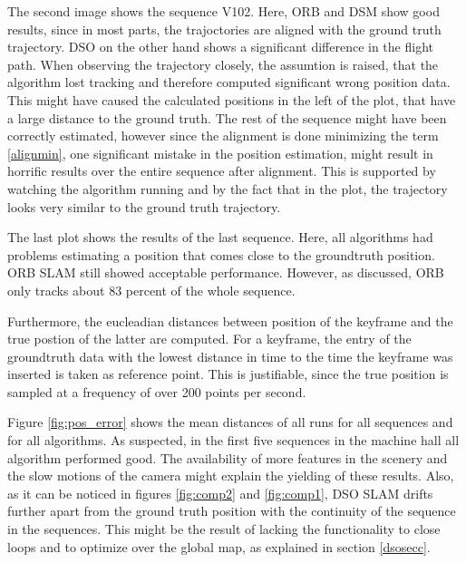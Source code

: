 	The second image shows the sequence V102. Here, ORB and DSM show good results, since in most parts, the trajoctories are aligned with the ground truth trajectory.
	DSO on the 
	other hand shows a significant difference in the flight path. When observing the trajectory closely, the assumtion is raised, that the algorithm lost tracking 
	and therefore computed significant wrong position data. This might have caused the calculated positions in the left of the plot, that have a large distance to 
	the ground truth. The rest of the sequence might have been correctly estimated, however since the alignment is done minimizing the term \ref{alignmin}, one significant 
	mistake in the position estimation, might result in horrific results over the entire sequence after alignment. This is supported by watching the algorithm running
	and by the fact that in the plot, the trajectory looks very similar to the ground truth trajectory.
	
	The last plot shows the results of the last sequence. Here, all algorithms had problems estimating a position that comes close to the groundtruth position. ORB
	SLAM still showed acceptable performance. However, as discussed, ORB only tracks about 83 percent of the whole sequence. 
	
	
	Furthermore, the eucleadian distances between position of the keyframe and the true postion of the latter are computed. For a keyframe, 
	the entry of the groundtruth data with the lowest distance in time to the time the keyframe was inserted is taken as reference point. 
	This is justifiable, since the true position is sampled at a frequency of over 200 points per second. 
	
	Figure \ref{fig:pos_error} shows the mean distances of all runs for all sequences and for all algorithms. As suspected, in the first five sequences in the machine 
	hall all algorithm performed good. The availability of more features in the scenery and the slow motions of the camera might explain the yielding of these results. 
	Also, as it can be noticed in figures \ref{fig:comp2} and \ref{fig:comp1}, DSO SLAM drifts further apart from the ground truth position with the continuity
	of the sequence in the sequences. 
	This might be the result of lacking the functionality to close loops and to optimize over the global map, as explained in section \ref{dsosecc}. 
	
